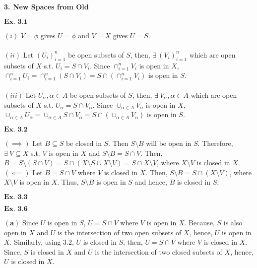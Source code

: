 \documentclass{article}
\begin{document}
\begin{center}
    \textbf{\large{3. New Spaces from Old}}
\end{center}

${\textbf{Ex. 3.1}}$

$(i)$ $V = \phi$ gives $U = \phi$ and $V=X$ gives $U = S$.\\~\\

$(ii)$ Let $(U_i)_{i=1}^{n}$ be open subsets of $S$, then, $\exists\ (V_i)_{i=1}^{n}$ which are open subsets of $X$ s.t. $U_i = S\cap V_i$. Since $\cap_{i=1}^{n}V_i$ is open in $X$, $\cap_{i=1}^{n}U_i = \cap_{i=1}^{n}(S\cap V_i) = S\cap (\cap_{i=1}^{n}V_i)$ is open in $S$.\\~\\

$(iii)$ Let $U_{\alpha}, \alpha \in A$ be open subsets of $S$, then, $\exists\ V_\alpha, \alpha \in A$ which are open subsets of $X$ s.t. $U_\alpha = S \cap V_{\alpha}$. Since $\cup_{\alpha \in A} V_{\alpha}$ is open in $X$, $\cup_{\alpha \in A}U_\alpha = \cup_{\alpha \in A}S\cap V_{\alpha} = S\cap(\cup_{\alpha \in A}V_{\alpha})$ is open in $S$.

\vspace{0.2in}

${\textbf{Ex. 3.2}}$

$(\implies)$ Let $B \subseteq S$ be closed in $S$. Then $S\setminus B$ will be open in $S$. Therefore, $\exists\ V\subseteq X$ s.t. $V$ is open in $X$ and $S\setminus B = S\cap V$. Then, $B = S\setminus (S\cap V) = S \cap (X\setminus S \cup X \setminus V) = S\cap X\setminus V$, where $X\setminus V$ is closed in $X$. $(\impliedby)$ Let $B = S\cap V$ where $V$ is closed in $X$. Then, $S\setminus B = S\cap (X\setminus V)$, where $X\setminus V$ is open in $X$. Thus, $S\setminus B$ is open in $S$ and hence, $B$ is closed in $S$.

\vspace{0.2in}

${\textbf{Ex. 3.3}}$


\vspace{0.2in}

${\textbf{Ex. 3.6}}$

$\mathbf{(a)}$ Since $U$ is open in $S$, $U = S \cap V$ where $V$ is open in $X$. Because, $S$ is also open in $X$ and $U$ is the intersection of two open subsets of $X$, hence, $U$ is open in $X$. Similarly, using $\mathbf{3.2}$, $U$ is closed in $S$, then, $U = S\cap V$ where $V$ is closed in $X$. Since, $S$ is closed in $X$ and $U$ is the intersection of two closed subsets of $X$, hence, $U$ is closed in $X$.\\~\\
\end{document}
